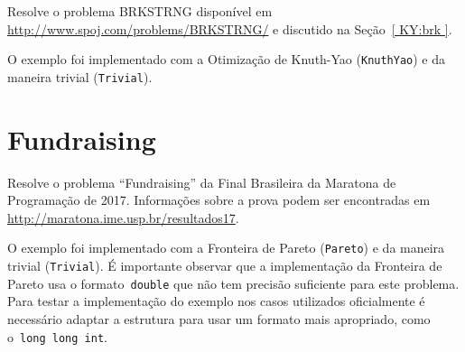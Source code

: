 Resolve o problema BRKSTRNG disponível em \href{http://www.spoj.com/problems/BRKSTRNG/}{http://www.spoj.com/problems/BRKSTRNG/} e discutido na Seção~\ref{ KY:brk }.

O exemplo foi implementado com a Otimização de Knuth-Yao (\texttt{KnuthYao}) e da maneira trivial (\texttt{Trivial}).


\section{Fundraising} \label{Fundraising}

Resolve o problema ``Fundraising'' da Final Brasileira da Maratona de Programação de 2017. Informações sobre a prova podem ser encontradas em \href{http://maratona.ime.usp.br/resultados17}{http://maratona.ime.usp.br/resultados17}.

O exemplo foi implementado com a Fronteira de Pareto (\texttt{Pareto}) e da maneira trivial (\texttt{Trivial}). É importante observar que a implementação da Fronteira de Pareto usa o formato~\texttt{double} que não tem precisão suficiente para este problema. Para testar a implementação do exemplo nos casos utilizados oficialmente é necessário adaptar a estrutura para usar um formato mais apropriado, como o~\texttt{long long int}.

